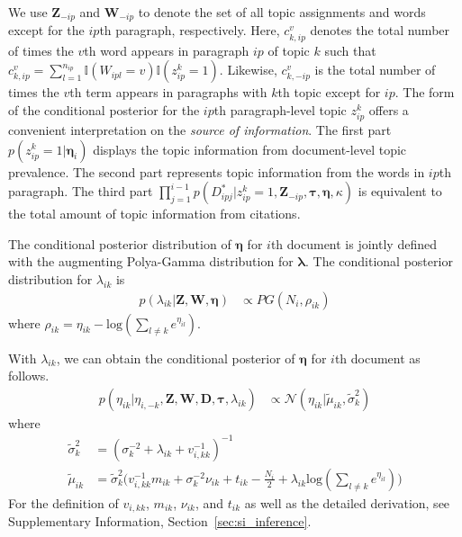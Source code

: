 We use $\textbf{Z}_{-ip}$ and $\textbf{W}_{-ip}$ to denote the set of all topic assignments and words except for the $ip$th paragraph, respectively.
Here, $c_{k,ip}^v$ denotes the total number of times the $v$th word appears in paragraph $ip$ of topic $k$ such that $c_{k,ip}^v = \sum_{l=1}^{n_{ip}}\mathbb{I}(W_{ipl}=v)\mathbb{I}(z_{ip}^k=1)$. Likewise, 
$c_{k,-ip}^v$ is the total number of times the $v$th term appears in paragraphs with $k$th topic except for $ip$. 
The form of the conditional posterior for the $ip$th paragraph-level topic $z_{ip}^k$ offers a convenient interpretation on the \textit{source of information}. The first part $p(z_{ip}^k=1|\pmb\eta_i)$ displays the topic information from document-level topic prevalence. The second part represents topic information from the words in $ip$th paragraph. The third part $\prod_{j=1}^{i-1}p(D_{ipj}^*|z_{ip}^k=1,\textbf{Z}_{-ip},\pmb\tau,\pmb\eta,\kappa)$ is equivalent to the total amount of topic information from citations. 

The conditional posterior distribution of $\pmb\eta$ for $i$th document is jointly defined with the augmenting Polya-Gamma distribution for $\pmb\lambda$. The conditional posterior distribution for $\lambda_{ik}$ is
\begin{align}
    p(\lambda_{ik}|\mathbf{Z},\mathbf{W},\pmb\eta) &\propto PG(N_i,\rho_{ik})
\end{align}
\noindent where $\rho_{ik} = \eta_{ik} - \text{log}(\sum_{l \neq k} e^{\eta_{il}})$.

With $\lambda_{ik}$, we can obtain the conditional posterior of $\pmb\eta$ for $i$th document as follows.
\begin{align}
    p(\eta_{ik}|\eta_{i,-k},\mathbf{Z},\mathbf{W},\mathbf{D},\pmb\tau,\lambda_{ik}) &\propto \mathcal{N}(\eta_{ik}|\tilde{\mu}_{ik},\tilde{\sigma}_k^2)
\end{align}
where
\begin{align}
    \tilde{\sigma}_k^2 &= (\sigma_k^{-2} + \lambda_{ik} + v_{i,kk}^{-1})^{-1} \nonumber \\
    \tilde{\mu}_{ik} &= \tilde{\sigma}_k^2 \big( v_{i,kk}^{-1}m_{ik} + \sigma_k^{-2}\nu_{ik} + t_{ik} - \frac{N_i}{2} + \lambda_{ik}\text{log}(\sum_{l\neq k}e^{\eta_{il}}) \big)
\end{align}
For the definition of $v_{i,kk}$, $m_{ik}$, $\nu_{ik}$, and $t_{ik}$ as well as the detailed derivation, see Supplementary Information, Section~\ref{sec:si_inference}.

